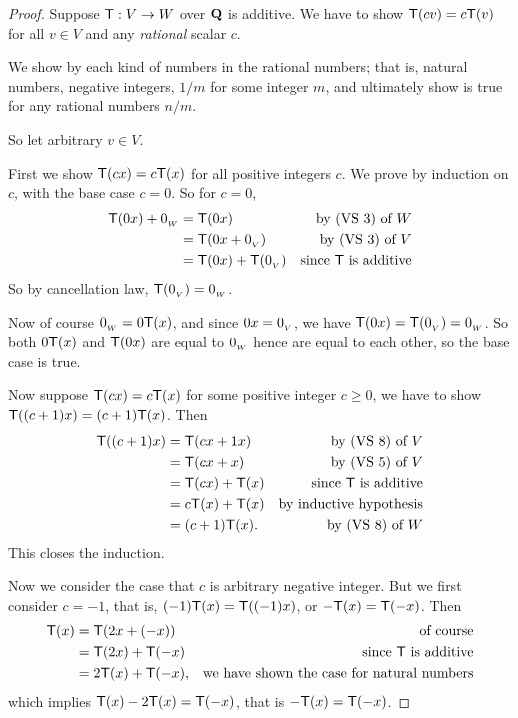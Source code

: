 \begin{proof}
Suppose \(\textsf{T} : V \to W\) over \(\mathbf{Q}\) is additive.
We have to show \(\textsf{T}(cv) = c\textsf{T}(v)\)  for all \(v \in V\) and any \emph{rational} scalar \(c\).

We show  by each kind of numbers in the rational numbers;
that is, natural numbers, negative integers, \(1/m\) for some integer \(m\), and ultimately show  is true for any rational numbers \(n/m\).

So let arbitrary \(v \in V\).

First we show \(\textsf{T}(cx) = c\textsf{T}(x)\) for all positive integers \(c\).
We prove by induction on \(c\), with the base case \(c = 0\).
So for \(c = 0\),
\begin{align*}
    \textsf{T}(0x) + 0_{_W} & = \textsf{T}(0x) & \text{by (VS 3) of \(W\)} \\
                 & = \textsf{T}(0x + 0_{_V}) & \text{by (VS 3) of \(V\)} \\
                 & = \textsf{T}(0x) + \textsf{T}(0_{_V}) & \text{since \(\textsf{T}\) is additive}
\end{align*}
So by cancellation law, \(\textsf{T}(0_{_V}) = 0_{_W}\).

Now of course \(0_{_W} = 0\textsf{T}(x)\), and since \(0x = 0_{_V}\), we have \(\textsf{T}(0x) = \textsf{T}(0_{_V}) = 0_{_W}\).
So both \(0\textsf{T}(x)\) and \(\textsf{T}(0x)\) are equal to \(0_{_W}\) hence are equal to each other, so the base case is true.

Now suppose \(\textsf{T}(cx) = c\textsf{T}(x)\) for some positive integer \(c \ge 0\), we have to show \(\textsf{T}((c + 1)x) = (c + 1)\textsf{T}(x)\).
Then
\begin{align*}
    \textsf{T}((c + 1)x) & = \textsf{T}(cx + 1x) & \text{by (VS 8) of \(V\)} \\
                 & = \textsf{T}(cx + x) & \text{by (VS 5) of \(V\)} \\
                 & = \textsf{T}(cx) + \textsf{T}(x) & \text{since \(\textsf{T}\) is additive} \\
                 & = c\textsf{T}(x) + \textsf{T}(x) & \text{by inductive hypothesis} \\
                 & = (c + 1)\textsf{T}(x). & \text{by (VS 8) of \(W\)}
\end{align*}
This closes the induction.

Now we consider the case that \(c\) is arbitrary negative integer.
But we first consider \(c = -1\), that is, \((-1)\textsf{T}(x) = \textsf{T}((-1)x)\), or \(-\textsf{T}(x) = \textsf{T}(-x)\).
Then
\begin{align*}
    \textsf{T}(x) & = \textsf{T}(2x + (-x)) & \text{of course} \\
          & = \textsf{T}(2x) + \textsf{T}(-x) & \text{since \(\textsf{T}\) is additive} \\
          & = 2\textsf{T}(x) + \textsf{T}(-x), & \text{we have shown the case for natural numbers}
\end{align*}
which implies \(\textsf{T}(x) - 2\textsf{T}(x) = \textsf{T}(-x)\), that is \(-\textsf{T}(x) = \textsf{T}(-x)\).


\end{proof}
